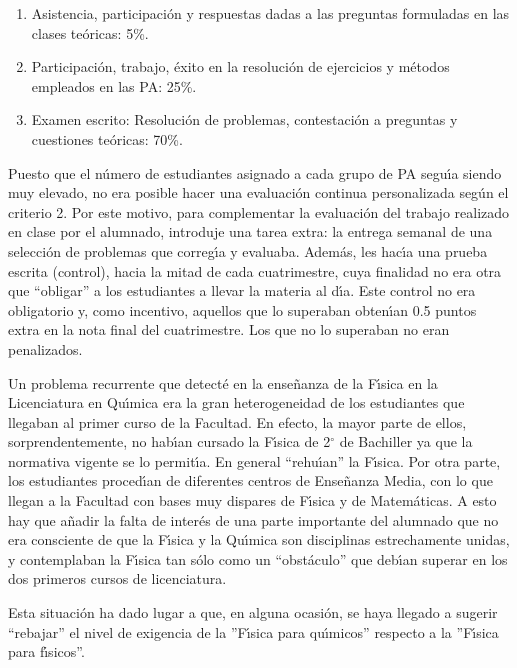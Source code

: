 \begin{enumerate}
\item Asistencia, participaci\'{o}n y respuestas dadas a las preguntas 
formuladas en las clases te\'{o}ricas: 5\%.
\item Participaci\'{o}n, trabajo, \'{e}xito en la resoluci\'{o}n 
de ejercicios y m\'{e}todos empleados en las PA: 25\%.
\item Examen escrito: Resoluci\'{o}n de problemas, contestaci\'{o}n
a preguntas y cuestiones te\'{o}ricas: 70\%.
\end{enumerate}

Puesto que el n\'{u}mero de estudiantes  asignado a  cada grupo de PA 
segu\'{\i}a siendo muy elevado, no era posible 
 hacer una evaluaci\'{o}n continua personalizada seg\'{u}n el criterio 2.
Por este motivo,  para complementar la evaluaci\'{o}n del 
 trabajo realizado en clase por el alumnado,
 introduje una tarea extra: la entrega semanal
de una selecci\'{o}n de problemas que  correg\'{\i}a y evaluaba.
Adem\'{a}s, les hac\'{\i}a una prueba escrita (control),
hacia la mitad de cada cuatrimestre, 
cuya finalidad no era otra que ``{o}bligar'' a los 
estudiantes  a llevar la materia al d\'{\i}a. 
Este control no era obligatorio y, como 
incentivo, aquellos  que lo superaban obten\'{\i}an  0.5 puntos
extra en la nota final del cuatrimestre. Los que no lo superaban
no eran penalizados.



Un problema recurrente que  detect\'{e} en la ense\~{n}anza de la F\'{\i}sica
en  la Licenciatura en Qu\'{\i}mica era la gran heterogeneidad de los 
estudiantes que llegaban al primer curso de la Facultad. En efecto, la mayor parte
de ellos, sorprendentemente,
no hab\'{\i}an cursado la F\'{\i}sica de  2{$^\circ$} de Bachiller
ya que la normativa vigente se lo permit\'{\i}a.
En general ``rehu\'{\i}an'' la F\'{\i}sica.
Por otra parte, los estudiantes proced\'{\i}an de diferentes centros de 
Ense\~{n}anza Media, con lo que llegan a la Facultad con bases
muy dispares de F\'{\i}sica y de Matem\'{a}ticas.
A esto hay que a\~{n}adir la falta de inter\'{e}s de una parte importante
del alumnado que no era consciente de que la F\'{\i}sica y la Qu\'{\i}mica
son disciplinas estrechamente unidas, y contemplaban la F\'{\i}sica tan
s\'{o}lo como un 
``obst\'{a}culo'' que deb\'{\i}an superar en los dos primeros cursos de 
licenciatura.

Esta situaci\'{o}n ha dado lugar a que, en alguna ocasi\'{o}n, se haya
llegado a sugerir ``rebajar'' el nivel de exigencia de la 
''F\'{\i}sica para qu\'{\i}micos'' respecto a la 
''F\'{\i}sica para f\'{\i}sicos''.

